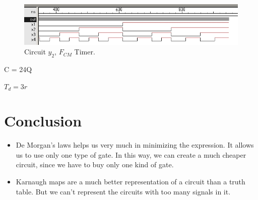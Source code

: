 \documentclass{article}
\begin{document}
			\begin{center} \begin{figure}[!ht]
				\begin{mdframed} \begin{center}
					\includegraphics[scale=0.4]{./imgs/Circuit1_FCM_ex2_timer.jpg}
					\caption{Circuit $y_2$, $F_{CM}$ Timer.}
				\end{center} \end{mdframed}
				\label{fig:circuit_y2_fcm_timer}
			\end{figure} \end{center}

			\begin{center}
				\par C = 24Q
				\par $T_d = 3r$
			\end{center}
			\pagebreak

	\newpage
	\section{Conclusion} %
		\begin{itemize}
			\item De Morgan's laws helps us very much in minimizing the expression. It allows us to use only one type of gate. In this way, we can create a much cheaper circuit, since we have to buy only one kind of gate.

			\item Karnaugh maps are a much better representation of a circuit than a truth table. But we can't represent the circuits with too many signals in it.
		\end{itemize}
\end{document}
